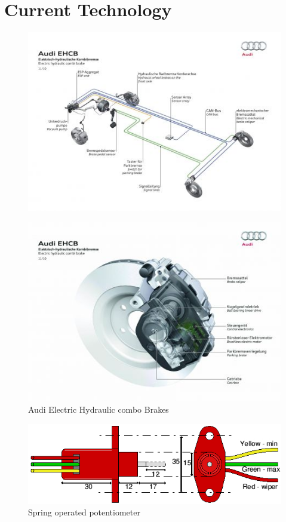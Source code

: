 \documentclass[a4paper]{report}
\begin{document}
{\section{Current Technology}
\label{app:brakes_current_technology}
\begin{figure}[h]
\centering
\includegraphics[scale=0.7]{figures/electronic_braking/audi_EHCB_1}
\caption{  \citep{audi_ehcb_1}}
\label{fig:audi_EHCB_1}
\end{figure}

\begin{figure}[h]
\centering
\includegraphics[scale=0.7]{figures/electronic_braking/audi_EHCB_2}
\caption{Audi Electric Hydraulic combo Brakes  \citep{audi_ehcb_2}}
\label{fig:audi_EHCB_2}
\end{figure}

\begin{figure}[h]
\centering
\includegraphics[scale=0.7]{figures/electronic_braking/spring_pot}
\caption{Spring operated potentiometer \citep{spring_pot}}
\label{fig:spring_pot}
\end{figure}

}
\end{document}
